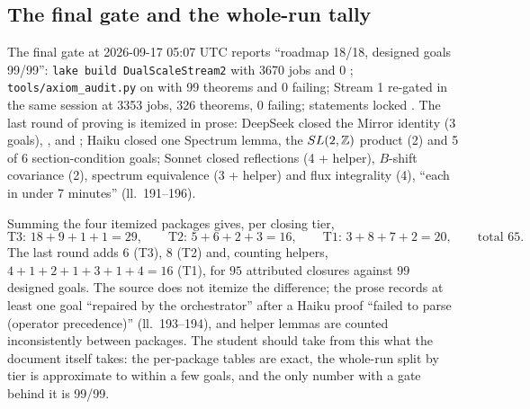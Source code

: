 \subsection{The final gate and the whole-run tally}

The final gate at 2026-09-17 05:07 UTC reports ``roadmap 18/18, designed goals 99/99'':
\texttt{lake build DualScaleStream2} with 3670 jobs and 0 ;
\texttt{tools/axiom\_audit.py} on  with 99 theorems and 0
failing; Stream 1 re-gated in the same session at 3353 jobs, 326 theorems, 0 failing;
statements locked . The last round
of proving is itemized in prose: DeepSeek closed the Mirror identity (3 goals),
, 
and ; Haiku closed one Spectrum lemma, the $SL(2,\mathbb{Z})$ product (2) and 5
of 6 section-condition goals; Sonnet closed reflections (4 + helper), $B$-shift covariance
(2), spectrum equivalence (3 + helper) and flux integrality (4), ``each in under 7
minutes'' (ll.~191--196).

\begin{example}\label{ex:pipeline:tally}
Summing the four itemized packages gives, per closing tier,
\[
\text{T3: } 18+9+1+1=29,\qquad \text{T2: } 5+6+2+3=16,\qquad \text{T1: } 3+8+7+2=20,
\qquad \text{total } 65 .
\]
The last round adds $6$ (T3), $8$ (T2) and, counting helpers, $4+1+2+1+3+1+4=16$ (T1),
for $95$ attributed closures against $99$ designed goals. The source does not itemize the
difference; the prose records at least one goal ``repaired by the orchestrator'' after a
Haiku proof ``failed to parse (operator precedence)'' (ll.~193--194), and helper lemmas are
counted inconsistently between packages. The student should take from this what the
document itself takes: the per-package tables are exact, the whole-run split by tier is
approximate to within a few goals, and the only number with a gate behind it is 99/99.
\end{example}


